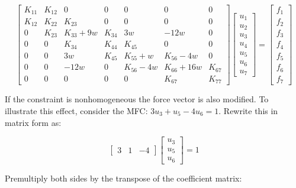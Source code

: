 \begin{equation}
    \begin{bmatrix}
        K_{11} & K_{12} & 0 & 0 & 0 & 0 & 0 \\
        K_{12} & K_{22} & K_{23} & 0 & 0 & 0 & 0 \\
        0 & K_{23} & K_{33} + 9 w & K_{34} & 3w & -12w & 0 \\
        0 & 0 & K_{34} & K_{44} & K_{45} & 0 & 0 \\
        0 & 0 & 3w & K_{45} & K_{55} + w & K_{56} - 4w & 0 \\
        0 & 0 & -12w & 0 & K_{56} - 4w & K_{66} + 16w & K_{67} \\
        0 & 0 & 0 & 0 & 0 & K_{67} & K_{77}
    \end{bmatrix}
    \begin{bmatrix}
        u_1 \\
        u_2 \\
        u_3 \\
        u_4 \\
        u_5 \\
        u_6 \\
        u_7
    \end{bmatrix}
    = \begin{bmatrix}
        f_1 \\
        f_2 \\
        f_3 \\
        f_4 \\
        f_5 \\
        f_6 \\
        f_7
    \end{bmatrix}
\end{equation}

If the constraint is nonhomogeneous the force vector is also modified. To illustrate this
effect, consider the MFC: $ 3 u_3 + u_5 - 4 u_6 = 1 $. Rewrite this in matrix form as:

\begin{equation}
    \begin{bmatrix}
        3 & 1 & -4
    \end{bmatrix}
    \begin{bmatrix}
        u_3 \\
        u_5 \\
        u_6
    \end{bmatrix}
    = 1
\end{equation}

Premultiply both sides by the transpose of the coefficient matrix:

